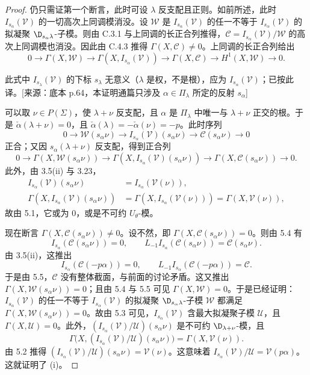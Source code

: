 \begin{proof}
仍只需证第一个断言，此时可设 $\lambda$ 反支配且正则。如前所述，此时 $I_{s_\alpha}(\mathcal{V})$ 的一切高次上同调模消没。设 $\mathcal{W}$ 是 $I_{s_\alpha}(\mathcal{V})$ 的任一不等于 $I_{s_\alpha}(\mathcal{V})$ 的拟凝聚 $\D_{s_\alpha\lambda}$-子模。则由 C.3.1 与上同调的长正合列推得，$\mathcal{C}=I_{s_\alpha}(\mathcal{V})/\mathcal{W}$ 的高次上同调模也消没。因此由 C.4.3 推得 $\Gamma(X,\mathcal{C})\ne 0$。上同调的长正合列给出
$$0\longrightarrow\Gamma(X,\mathcal{W})\longrightarrow\Gamma(X,I_{s_\alpha}(\mathcal{V}))\longrightarrow\Gamma(X,\mathcal{C})\longrightarrow H^1(X,\mathcal{W})\longrightarrow 0.$$
\begin{annote}
此式中 $I_{s_\lambda}(\mathcal{V})$ 的下标 $s_\lambda$ 无意义（$\lambda$ 是权，不是根），应为 $I_{s_\alpha}(\mathcal{V})$；已按此译。[来源：底本 p.64，本证明通篇只涉及 $\alpha\in\Pi_\lambda$ 所定的反射 $s_\alpha$]
\end{annote}

可以取 $\nu\in P(\Sigma)$，使 $\lambda+\nu$ 反支配，且 $\alpha$ 是 $\Pi_\lambda$ 中唯一与 $\lambda+\nu$ 正交的根。于是 $\check{\alpha}(\lambda+\nu)=0$，且 $\check{\alpha}(\lambda)=-\check{\alpha}(\nu)=-p$。此时序列
$$0\longrightarrow\mathcal{W}(s_\alpha\nu)\longrightarrow I_{s_\alpha}(\mathcal{V})(s_\alpha\nu)\longrightarrow\mathcal{C}(s_\alpha\nu)\longrightarrow 0$$
正合；又因 $s_\alpha(\lambda+\nu)$ 反支配，得到正合列
$$0\longrightarrow\Gamma(X,\mathcal{W}(s_\alpha\nu))\longrightarrow\Gamma(X,I_{s_\alpha}(\mathcal{V})(s_\alpha\nu))\longrightarrow\Gamma(X,\mathcal{C}(s_\alpha\nu))\longrightarrow 0.$$
此外，由 3.5(ii) 与 3.23，
{\small
\begin{align*}
I_{s_\alpha}(\mathcal{V})(s_\alpha\nu)&=I_{s_\alpha}(\mathcal{V}(\nu)),\\
\Gamma(X,I_{s_\alpha}(\mathcal{V})(s_\alpha\nu))&=\Gamma(X,I_{s_\alpha}(\mathcal{V}(\nu)))=\Gamma(X,\mathcal{V}(\nu)),
\end{align*}}
故由 5.1，它或为 $0$，或是不可约 $U_\theta$-模。

现在断言 $\Gamma(X,\mathcal{C}(s_\alpha\nu))\ne 0$。设不然，即 $\Gamma(X,\mathcal{C}(s_\alpha\nu))=0$。则由 5.4 有
$$I_{s_\alpha}(\mathcal{C}(s_\alpha\nu))=0,\qquad L_{-1}I_{s_\alpha}(\mathcal{C}(s_\alpha\nu))=\mathcal{C}(s_\alpha\nu).$$
由 3.5(ii)，这推出
$$I_{s_\alpha}(\mathcal{C}(-p\alpha))=0,\qquad L_{-1}I_{s_\alpha}(\mathcal{C}(-p\alpha))=\mathcal{C}.$$
于是由 5.5，$\mathcal{C}$ 没有整体截面，与前面的讨论矛盾。这又推出 $\Gamma(X,\mathcal{W}(s_\alpha\nu))=0$；且由 5.4 与 5.5 可见 $\Gamma(X,\mathcal{W})=0$。于是已经证明：$I_{s_\alpha}(\mathcal{V})$ 的任一不等于 $I_{s_\alpha}(\mathcal{V})$ 的拟凝聚 $\D_{s_\alpha\lambda}$-子模 $\mathcal{W}$ 都满足 $\Gamma(X,\mathcal{W}(s_\alpha\nu))=0$。故由 5.3 可见，$I_{s_\alpha}(\mathcal{V})$ 含最大拟凝聚子模 $\mathcal{U}$，且 $\Gamma(X,\mathcal{U})=0$。此外，$(I_{s_\alpha}(\mathcal{V})/\mathcal{U})(s_\alpha\nu)$ 是不可约 $\D_{\lambda+\nu}$-模，且
$$\Gamma\bigl(X,(I_{s_\alpha}(\mathcal{V})/\mathcal{U})(s_\alpha\nu)\bigr)=\Gamma(X,\mathcal{V}(\nu)).$$
由 5.2 推得 $(I_{s_\alpha}(\mathcal{V})/\mathcal{U})(s_\alpha\nu)=\mathcal{V}(\nu)$。这意味着 $I_{s_\alpha}(\mathcal{V})/\mathcal{U}=\mathcal{V}(p\alpha)$。这就证明了 (i)。


\end{proof}
